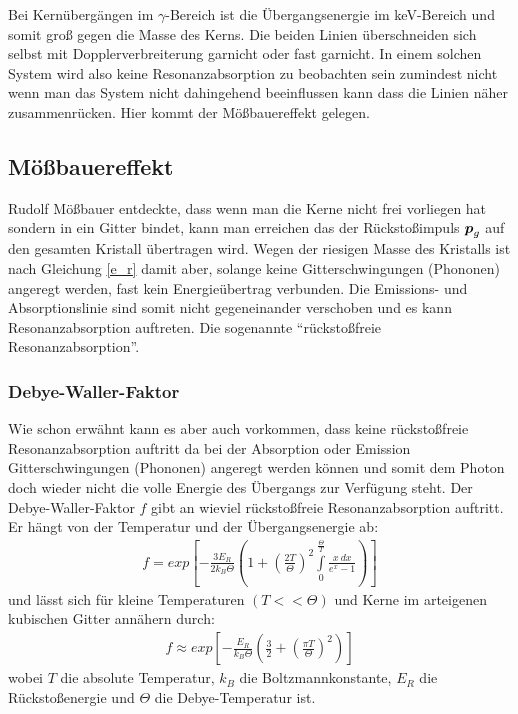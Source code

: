 \documentclass[12pt]{article}
\renewcommand*\vec[1]{{\mbox{\boldmath\ensuremath{#1}}}}
\begin{document}
Bei Kernübergängen im $\gamma$-Bereich ist die Übergangsenergie im keV-Bereich und somit groß gegen die Masse des Kerns. Die beiden Linien überschneiden sich
selbst mit Dopplerverbreiterung garnicht oder fast garnicht. In einem solchen System wird also keine Resonanzabsorption zu beobachten sein zumindest nicht
wenn man das System nicht dahingehend beeinflussen kann dass die Linien näher zusammenrücken. Hier kommt der Mößbauereffekt gelegen.

\subsection{Mößbauereffekt}
Rudolf Mößbauer entdeckte, dass wenn man die Kerne nicht frei vorliegen hat sondern in ein Gitter bindet, kann man erreichen das der Rückstoßimpuls $\vec{p}_g$
auf den gesamten Kristall übertragen wird. Wegen der riesigen Masse des Kristalls ist nach Gleichung \ref{e_r} damit aber, solange keine Gitterschwingungen (Phononen) angeregt werden,
fast kein Energieübertrag verbunden. Die Emissions- und Absorptionslinie sind somit nicht gegeneinander verschoben und es kann Resonanzabsorption auftreten. Die sogenannte
``rückstoßfreie Resonanzabsorption''.

\subsubsection{Debye-Waller-Faktor}
Wie schon erwähnt kann es aber auch vorkommen, dass keine rückstoßfreie Resonanzabsorption auftritt da bei der Absorption oder Emission Gitterschwingungen (Phononen) 
angeregt werden können und somit dem Photon doch wieder nicht die volle Energie des Übergangs zur Verfügung steht. Der Debye-Waller-Faktor $f$ gibt an wieviel rückstoßfreie Resonanzabsorption
auftritt. Er hängt von der Temperatur und der Übergangsenergie ab:
\begin{align}
 f = exp\left[ -\frac{3E_R}{2k_B\Theta}\left(1+\left(\frac{2T}{\Theta}\right)^2 \int\limits_{0}^{\frac{\Theta}{T}} \frac{x~dx}{e^x - 1}\right)\right]
\end{align}
und lässt sich für kleine Temperaturen $(T<<\Theta)$ und Kerne im arteigenen kubischen Gitter annähern durch:
\begin{align}
 f \approx exp \left[ -\frac{E_R}{k_B\Theta}\left(\frac{3}{2} + \left(\frac{\pi T}{\Theta}\right)^2\right)\right]
\end{align}
wobei $T$ die absolute Temperatur, $k_B$ die Boltzmannkonstante, $E_R$ die Rückstoßenergie und $\Theta$ die Debye-Temperatur ist.
\end{document}
